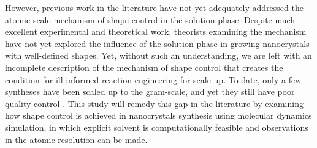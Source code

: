 However, previous work in the literature have not yet adequately addressed the atomic scale mechanism of shape control in the solution phase.
Despite much excellent experimental and theoretical work, theorists examining the mechanism have not yet explored the influence of the solution phase in growing nanocrystals with well-defined shapes.
Yet, without such an understanding, we are left with an incomplete description of the mechanism of shape control that creates the condition for ill-informed reaction engineering for scale-up.
To date, only a few syntheses have been scaled up to the gram-scale, and yet they still have poor quality control \cite{Jana_2005,Lohse_2013}.
This study will remedy this gap in the literature by examining how shape control is achieved in nanocrystals synthesis using molecular dynamics simulation, in which explicit solvent is computationally feasible and observations in the atomic resolution can be made.


  
  
  